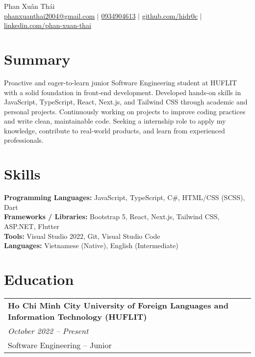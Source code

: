 \documentclass[a4paper,11pt]{article}
\begin{document}
\pagestyle{empty}

\begin{center}
\LARGE{Phan Xuân Thái} \\[5pt]
\small{\href{mailto:phanxuanthai2004@gmail.com}{phanxuanthai2004@gmail.com} $|$ 
\href{tel:0934904613}{0934904613} $|$ 
\href{https://github.com/hidr0c}{github.com/hidr0c} $|$ 
\href{https://www.linkedin.com/in/xuân-thái-phan-bab693352/}{linkedin.com/phan-xuan-thai} 
} \\[2pt]
\end{center}
\vspace{1.5em}

\section{Summary}
Proactive and eager-to-learn junior Software Engineering student at HUFLIT with a solid foundation in front-end development. Developed hands-on skills in JavaScript, TypeScript, React, Next.js, and Tailwind CSS through academic and personal projects. Continuously working on projects to improve coding practices and write clean, maintainable code. Seeking a internship role to apply my knowledge, contribute to real-world products, and learn from experienced professionals.

\section{Skills}
\textbf{Programming Languages:} JavaScript, TypeScript, C\#, HTML/CSS (SCSS), Dart \\
\textbf{Frameworks / Libraries:} Bootstrap 5, React, Next.js, Tailwind CSS, ASP.NET, Flutter \\
\textbf{Tools:} Visual Studio 2022, Git, Visual Studio Code \\
\textbf{Languages:} Vietnamese (Native), English (Intermediate) 

\section{Education}
\begin{tabularx}{\linewidth}{@{}l@{}}
\textbf{Ho Chi Minh City University of Foreign Languages and Information Technology (HUFLIT)} \\
\normalsize\textit{October 2022 -- Present} \\
Software Engineering -- Junior
\end{tabularx}
\end{document}
